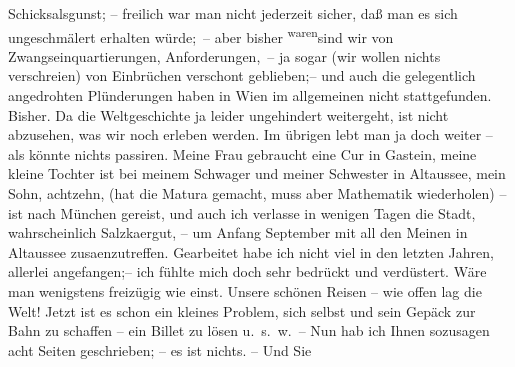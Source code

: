 \begin{ledgroupsized}[t]{13cm}
                    Schicksalsgunst; – freilich  war man nicht
                    jederzeit sicher, daß man es sich unge{\pb}schmälert erhalten würde; – aber bisher \substVorne{}\textsuperscript{waren}\substDazwischen{}sind\substHinten{} wir von Zwangseinquartierungen, Anforderungen, – ja sogar (wir wollen
                    nichts verschreien) von Einbrüchen verschont geblieben;– und auch die
                    gelegentlich angedrohten Plünderungen haben in Wien im allgemeinen nicht stattgefunden. Bisher. Da die Weltgeschichte
                    ja leider ungehindert weitergeht, ist nicht abzusehen, was wir noch erleben
                    werden. Im übrigen lebt man ja doch weiter – als könnte nichts passiren. Meine
                        Frau gebraucht eine Cur
                    in Gastein, meine kleine Tochter ist bei meinem Schwager und meiner Schwester in Altaussee, mein Sohn, achtzehn, (hat die Matura gemacht, muss aber
                    Mathematik wiederholen) – ist nach München
                    gereist, und auch ich verlasse in wenigen Tagen die Stadt, wahrschein{\pb}lich Salzka{\geminationm}ergut, – um Anfang September mit all den
                    Meinen in Altaussee zusa{\geminationm}enzutreffen.\pend
           \pstart
           Gearbeitet habe ich nicht viel in den letzten Jahren, allerlei angefangen;– ich
                    fühlte mich doch sehr bedrückt und verdüstert. Wäre man wenigstens freizügig wie
                    einst. Unsere schönen Reisen – wie offen lag die Welt! Jetzt ist es schon ein
                    kleines Problem, sich selbst und sein Gepäck zur Bahn zu schaffen – ein Billet
                    zu lösen u. s. w. –\pend
           \pstart
           Nun hab ich Ihnen sozusagen acht Seiten geschrieben; – es ist nichts. – Und Sie

\end{ledgroupsized}
